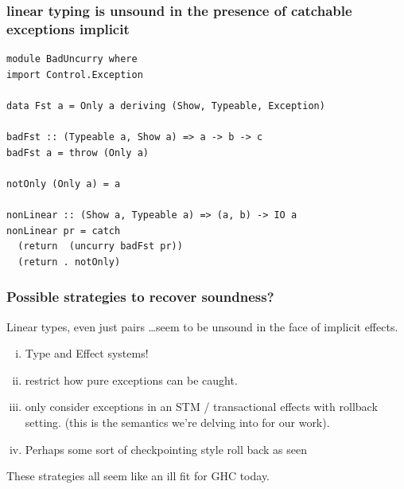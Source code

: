 \documentclass[11pt,reqno]{beamer}
\begin{document}
\begin{frame}[fragile]
\frametitle{linear typing is unsound in the presence of catchable exceptions implicit }
\begin{verbatim}
module BadUncurry where
import Control.Exception

data Fst a = Only a deriving (Show, Typeable, Exception)

badFst :: (Typeable a, Show a) => a -> b -> c
badFst a = throw (Only a)

notOnly (Only a) = a

nonLinear :: (Show a, Typeable a) => (a, b) -> IO a
nonLinear pr = catch
  (return  (uncurry badFst pr))
  (return . notOnly)
\end{verbatim}
\end{frame}

\begin{frame}\frametitle{Possible strategies to recover soundness?}
Linear types, even just pairs \ldots seem to be unsound in the
face of implicit effects.

\begin{enumerate}[(i)]
  \item Type and Effect systems!  %
  \item restrict how pure exceptions can be caught.
  \item only consider exceptions in an STM / transactional effects with rollback setting.
        (this is the semantics we're delving into for our work).
  \item Perhaps some sort of checkpointing style roll back as seen
\end{enumerate}

These strategies all seem like an ill fit for GHC today.

\end{frame}
\end{document}
